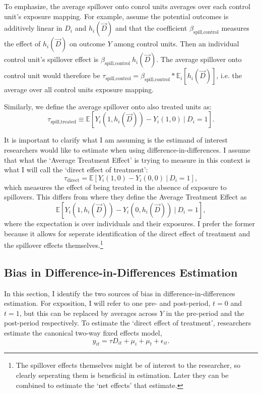 \documentclass[11pt]{article}
\begin{document}
To emphasize, the average spillover onto conrol units averages over each control unit's exposure mapping. For example, assume the potential outcomes is additively linear in $D_i$ and $h_i(\vec{D})$ and that the coefficient $\beta_{\text{spill,control}}$ measures the effect of $h_i(\vec{D})$ on outcome $Y$ among control units. Then an individual control unit's spillover effect is $\beta_{\text{spill,control}} \ h_i(\vec{D})$. The average spillover onto control unit would therefore be $\tau_{\text{spill,control}} = \beta_{\text{spill,control}} * \mathbb{E}_{i} \left[ h_i(\vec{D})\right]$, i.e. the average over all control units exposure mapping.

Similarly, we define the average spillover onto also treated units as: \[ 
    \tau_{\text{spill,treated}} \equiv \mathbb{E} \left[ Y_{i}(1, h_i(\vec{D})) - Y_{i}(1, 0) \ \vert \ D_i = 1 \right].
\] 

It is important to clarify what I am assuming is the estimand of interest researchers would like to estimate when using difference-in-differences. I assume that what the `Average Treatment Effect' is trying to measure in this context is what I will call the `direct effect of treatment': \[
    \tau_{\text{direct}} = \mathbb{E} \left[ Y_{i}(1, 0) - Y_{i}(0, 0) \ \vert \ D_i = 1 \right],
\] 
which measures the effect of being treated in the absence of exposure to spillovers. This differs from \citet{Sävje_Aronow_Hudgens_2019} where they define the Average Treatment Effect as \[ 
    \mathbb{E} \left[ Y_{i}(1, h_i(\vec{D})) - Y_{i}(0, h_i(\vec{D})) \ \vert \ D_i = 1 \right],
\] 
where the expectation is over individuals and their exposures. I prefer the former because it allows for seperate identification of the direct effect of treatment and the spillover effects themselves.\footnote{The spillover effects themselves might be of interest to the researcher, so clearly seperating them is beneficial in estimation. Later they can be combined to estimate the `net effects' that \citet{Sävje_Aronow_Hudgens_2019} estimate.}


\subsection{Bias in Difference-in-Differences Estimation}

In this section, I identify the two sources of bias in difference-in-differences estimation. For exposition, I will refer to one pre- and post-period, $t = 0$ and $t = 1$, but this can be replaced by averages across $Y$ in the pre-period and the post-period respectively. To estimate the `direct effect of treatment', researchers estimate the canonical two-way fixed effects model, 
\begin{equation}\label{eq:twfe}    
    y_{it} = \tau D_{it} + \mu_i + \mu_t + \epsilon_{it}.
\end{equation}
\end{document}
